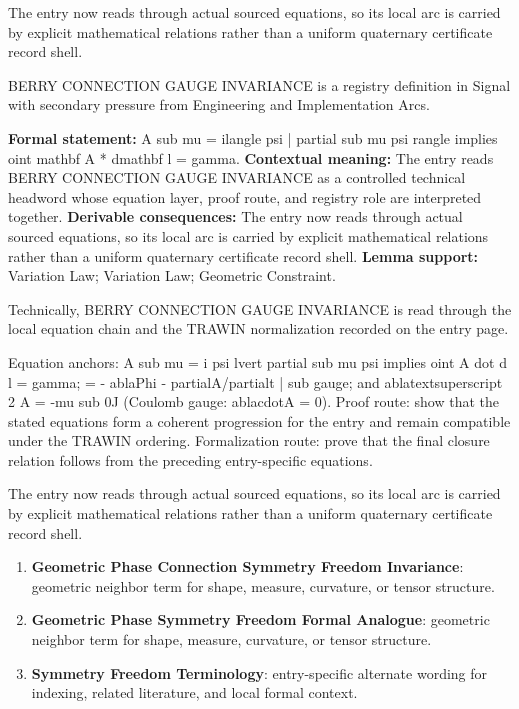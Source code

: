 The entry now reads through actual sourced equations, so its local arc is carried by explicit mathematical relations rather than a uniform quaternary certificate record shell.
\clearpage


\begingroup\small
{}
BERRY CONNECTION GAUGE INVARIANCE is a registry definition in Signal with secondary pressure from Engineering and Implementation Arcs.

\begingroup\footnotesize\setlength{\emergencystretch}{3em}\sloppy
\textbf{Formal statement:} A sub mu = ilangle psi | partial sub mu psi rangle implies oint mathbf A * dmathbf l = gamma. \textbf{Contextual meaning:} The entry reads BERRY CONNECTION GAUGE INVARIANCE as a controlled technical headword whose equation layer, proof route, and registry role are interpreted together. \textbf{Derivable consequences:} The entry now reads through actual sourced equations, so its local arc is carried by explicit mathematical relations rather than a uniform quaternary certificate record shell. \textbf{Lemma support:} Variation Law; Variation Law; Geometric Constraint.\par
\endgroup

Technically, BERRY CONNECTION GAUGE INVARIANCE is read through the local equation chain and the TRAWIN normalization recorded on the entry page.

Equation anchors: A sub mu = i psi lvert partial sub mu psi implies oint A dot d l = gamma;   = - ablaPhi - partialA/partialt | sub gauge; and ablatextsuperscript 2 A = -mu sub 0J (Coulomb gauge: ablacdotA = 0). Proof route: show that the stated equations form a coherent progression for the entry and remain compatible under the TRAWIN ordering. Formalization route: prove that the final closure relation follows from the preceding entry-specific equations.

The entry now reads through actual sourced equations, so its local arc is carried by explicit mathematical relations rather than a uniform quaternary certificate record shell.
\endgroup

\begin{enumerate}[leftmargin=1.6em,itemsep=6pt,topsep=4pt]
\item \textbf{Geometric Phase Connection Symmetry Freedom Invariance}: geometric neighbor term for shape, measure, curvature, or tensor structure.
\item \textbf{Geometric Phase Symmetry Freedom Formal Analogue}: geometric neighbor term for shape, measure, curvature, or tensor structure.
\item \textbf{Symmetry Freedom Terminology}: entry-specific alternate wording for indexing, related literature, and local formal context.
\end{enumerate}


